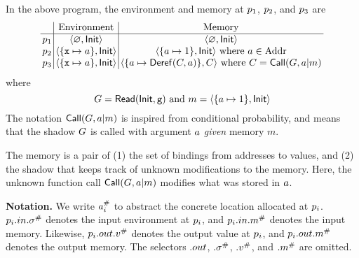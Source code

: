 \documentclass{article}
\begin{document}
In the above program, the environment and memory at $p_1$, $p_2$, and $p_3$ are
\[
  \setlength{\arraycolsep}{2pt}
  \begin{array}{c|c|c}
              & \text{Environment}                                     & \text{Memory}                                                                                                       \\
    \hline
    \ppoint_1 & \langle\varnothing,\InitE\rangle                       & \langle\varnothing,\InitE\rangle                                                                                    \\
    \ppoint_2 & \langle\{\texttt{x}\mapsto\abbrtext{a}\},\InitE\rangle & \langle\{\abbrtext{a}\mapsto 1\},\InitE\rangle\text{ where }\abbrtext{a}\in\Addr                                    \\
    \ppoint_3 & \langle\{\texttt{x}\mapsto\abbrtext{a}\},\InitE\rangle & \langle\{\abbrtext{a}\mapsto \DerefAE(C,\abbrtext{a})\},C\rangle\text{ where }C=\CallE(\abbrtext{G},\abbrtext{a}|m)
  \end{array}
\]
where
\[{G}=\mathsf{Read}(\mathsf{Init},\texttt{g})\text{ and }m=\langle\{{a}\mapsto 1\},\mathsf{Init}\rangle\]
The notation $\mathsf{Call}({G},{a}|m)$ is inspired from conditional probability,
and means that the shadow ${G}$ is called with argument ${a}$ \emph{given}
memory $m$.

The memory is a pair of (1) the set of bindings from addresses to values,
and (2) the shadow that keeps track of unknown modifications to the memory.
Here, the unknown function call $\mathsf{Call}({G},{a}|m)$
modifies what was stored in ${a}$.

\vspace{\topsep}
\noindent\textbf{Notation.}
We write ${{a}}^{\#}_i$ to abstract the concrete location
allocated at $p_i$.
$p_i.{in}.{\sigma}^{\#}$ denotes the input environment
at $p_i$,
and $p_i.{in}.{m}^{\#}$ denotes the input memory.
Likewise, $p_i.{out}.{v}^{\#}$ denotes
the output value at $p_i$,
and $p_i.{out}.{m}^{\#}$ denotes
the output memory.
The selectors $.{out}$, $.{\sigma}^{\#}$, $.{v}^{\#}$, and $.{m}^{\#}$
are omitted.
\end{document}
